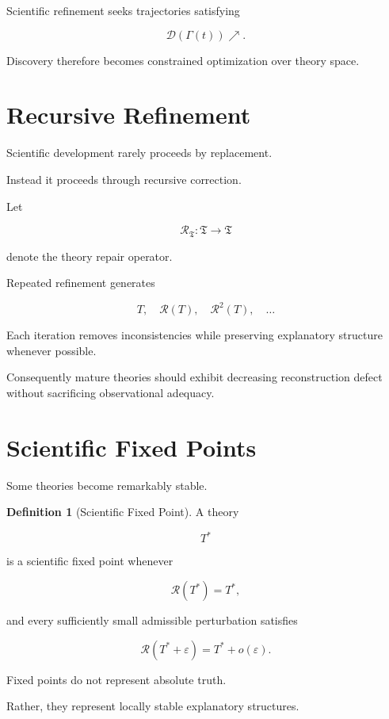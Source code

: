 \documentclass[11pt,oneside]{book}
\numberwithin{equation}{chapter}
\theoremstyle{definition}
\newtheorem{definition}{Definition}[chapter]
\theoremstyle{plain}
\begin{document}
Scientific refinement seeks trajectories satisfying

\[
\mathcal{D}
(\Gamma(t))
\nearrow.
\]

Discovery therefore becomes constrained optimization over theory space.

\section{Recursive Refinement}

Scientific development rarely proceeds by replacement.

Instead it proceeds through recursive correction.

Let

\[
\mathcal{R}_{\mathfrak T}
:
\mathfrak T
\rightarrow
\mathfrak T
\]

denote the theory repair operator.

Repeated refinement generates

\[
T,
\quad
\mathcal R(T),
\quad
\mathcal R^2(T),
\quad
\ldots
\]

Each iteration removes inconsistencies while preserving explanatory
structure whenever possible.

Consequently mature theories should exhibit decreasing reconstruction defect
without sacrificing observational adequacy.

\section{Scientific Fixed Points}

Some theories become remarkably stable.

\begin{definition}[Scientific Fixed Point]

A theory

\[
T^\ast
\]

is a scientific fixed point whenever

\[
\mathcal R(T^\ast)
=
T^\ast,
\]

and every sufficiently small admissible perturbation satisfies

\[
\mathcal R(T^\ast+\varepsilon)
=
T^\ast
+
o(\varepsilon).
\]

\end{definition}

Fixed points do not represent absolute truth.

Rather, they represent locally stable explanatory structures.
\end{document}
